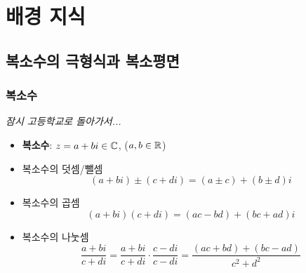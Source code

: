\section{배경 지식}

\subsection*{복소수의 극형식과 복소평면}

\begin{frame}
    \frametitle{복소수}
    \textit{잠시 고등학교로 돌아가서...} \pause
    \begin{itemize}
        \item \textbf{복소수}: \(z = a + bi \in \mathbb{C}\), (\(a, b \in \mathbb{R}\)) \pause
        \item 복소수의 덧셈/뺄셈
              \[
                  (a + bi) \pm (c + di) = (a \pm c) + (b \pm d)i
              \] \pause
        \item 복소수의 곱셈
              \[
                  (a + bi)(c + di) = (ac - bd) + (bc + ad)i
              \] \pause
        \item 복소수의 나눗셈
              \[
                  \frac{a + bi}{c + di} = \frac{a + bi}{c + di} \cdot \frac{c - di}{c - di} = \frac{(ac + bd) + (bc-ad)}{c^2 + d^2}
              \]
    \end{itemize}
\end{frame}

